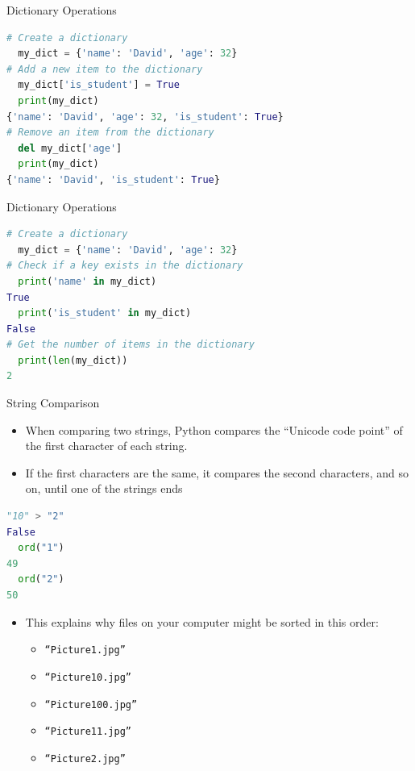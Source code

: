 \begin{frame}[fragile]{Dictionary Operations}
    \begin{lstlisting}[language=Python]
# Create a dictionary
  my_dict = {'name': 'David', 'age': 32}
# Add a new item to the dictionary 
  my_dict['is_student'] = True
  print(my_dict)
{'name': 'David', 'age': 32, 'is_student': True}
# Remove an item from the dictionary
  del my_dict['age']
  print(my_dict)
{'name': 'David', 'is_student': True}
    \end{lstlisting}
\end{frame} 

\begin{frame}[fragile]{Dictionary Operations}
    \begin{lstlisting}[language=Python]
# Create a dictionary
  my_dict = {'name': 'David', 'age': 32}
# Check if a key exists in the dictionary
  print('name' in my_dict)
True
  print('is_student' in my_dict)
False
# Get the number of items in the dictionary
  print(len(my_dict))
2
    \end{lstlisting}
\end{frame} 


\begin{frame}[fragile]{String Comparison}
    \begin{itemize}
        \item When comparing two strings, Python compares the ``Unicode code point'' of the first character of each string.
        \item If the first characters are the same, it compares the second characters, and so on, until one of the strings ends
    \end{itemize}

    \begin{lstlisting}[language=Python]
  "10" > "2"
False
  ord("1")
49
  ord("2")
50
    \end{lstlisting}
\end{frame}

\begin{frame}
    \begin{itemize}
        \item This explains why files on your computer might be sorted in this order:
        \begin{itemize}
            \item \texttt{``Picture1.jpg''}
            \item \texttt{``Picture10.jpg''}
            \item \texttt{``Picture100.jpg''}
            \item \texttt{``Picture11.jpg''}
            \item \texttt{``Picture2.jpg''}
        \end{itemize}
    \end{itemize}
\end{frame}

